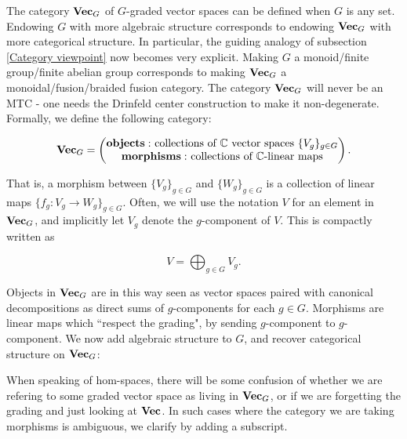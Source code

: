 \documentclass{article}
\theoremstyle{definition}
\numberwithin{figure}{section}
\begin{document}
The category $\bold{Vec}_G$ of $G$-graded vector spaces can be defined when $G$ is any set. Endowing $G$ with more algebraic structure corresponds to endowing $\bold{Vec}_G$ with more categorical structure. In particular, the guiding analogy of subsection \ref{Category viewpoint} now becomes very explicit. Making $G$ a monoid/finite group/finite abelian group corresponds to making $\bold{Vec}_G$ a monoidal/fusion/braided fusion category. The category $\bold{Vec}_G$ will never be an MTC - one needs the Drinfeld center construction to make it non-degenerate. Formally, we define the following category:

$$\bold{Vec}_G=
\begin{pmatrix}
\bold{objects: }\text{ collections of $\mathbb{C}$ vector spaces }\{V_g\}_{g\in G}\\
\bold{morphisms: }\text{ collections of $\mathbb{C}$-linear maps}
\end{pmatrix}.$$

That is, a morphism between $\{V_g\}_{g\in G}$ and $\{W_g\}_{g\in G}$ is a collection of linear maps $\{f_g:V_g\to W_g\}_{g\in G}.$ Often, we will use the notation $V$ for an element in $\bold{Vec}_G$, and implicitly let $V_g$ denote the $g$-component of $V$. This is compactly written as

$$V=\bigoplus_{g\in G}V_g.$$

Objects in $\bold{Vec}_G$ are in this way seen as vector spaces paired with canonical decompositions as direct sums of $g$-components for each $g\in G$. Morphisms are linear maps which ``respect the grading", by sending $g$-component to $g$-component. We now add algebraic structure to $G$, and recover categorical structure on $\bold{Vec}_G$:

When speaking of hom-spaces, there will be some confusion of whether we are refering to some graded vector space as living in $\bold{Vec}_G$, or if we are forgetting the grading and just looking at $\bold{Vec}$. In such cases where the category we are taking morphisms is ambiguous, we clarify by adding a subscript.
\end{document}
